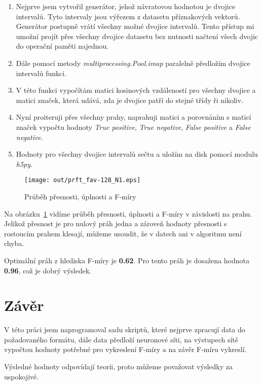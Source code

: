 \documentclass[11pt]{article}
\begin{document}
    \begin{enumerate}
        \item Nejprve jsem vytvořil generátor, jehož návratovou hodnotou je dvojice intervalů.
        Tyto intervaly jsou výřezem z datasetu příznakových vektorů.
        Generátor postupně vrátí všechny možné dvojice intervalů.
        Tento přístup mi umožní projít přes všechny dvojice datasetu bez nutnosti načtení všech dvojic do operační
        paměti najednou.
        \item Dále pomocí metody \textit{multiprocessing.Pool.imap} paralelně předložím dvojice intervalů funkci.
        \item V této funkci vypočítám matici kosinových vzdáleností pro všechny dvojice a matici značek, která udává,
        zda je dvojice patří do stejné třídy ři nikoliv.
        \item Nyní proiteruji přes všechny prahy, naprahuji matici a porovnáním s maticí značek vypočtu hodnoty
        \textit{True positive}, \textit{True negative}, \textit{False positive} a \textit{False negative}.
        \item Hodnoty pro všechny dvojice intervalů sečtu a uložím na disk pomocí modulu \textit{h5py}.
    \end{enumerate}

    \begin{figure}[H]
        \centering
        \texttt{[image: out/prft\_fav-128\_N1.eps]}
        \caption{Průběh přesnosti, úplnosti a F-míry}
        \label{fig:prft}
    \end{figure}

    Na obrázku~\ref{fig:prft} vidíme průběh přesnosti, úplnosti a F-míry v závislosti na prahu.
    Jelikož přesnost je pro nulový práh jedna a zároveň hodnoty přesnosti s rostoucím prahem klesají, můžeme usoudit,
    že v datech ani v algoritmu není chyba.

    Optimální práh z hlediska F-míry je \textbf{0.62}.
    Pro tento práh je dosažena hodnota \textbf{0.96}, což je dobrý výsledek.

    \section{Závěr}
    V této práci jsem naprogramoval sadu skriptů, které nejprve zpracují data do požadovaného formátu, dále data
    předloží neuronové síti, na výstupech sítě vypočtou hodnoty potřebné pro vykreslení F-míry a na závěr
    F-míru vykreslí.

    Výsledné hodnoty odpovídají teorii, proto můžeme považovat výsledky za uspokojivé.
\end{document}
